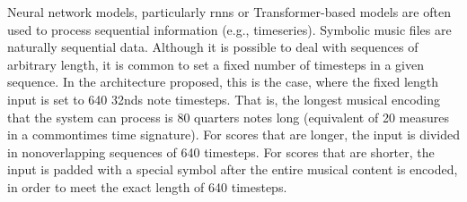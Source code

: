 
Neural network models, particularly \glspl{rnn} or
Transformer-based models are often used to process
sequential information (e.g., timeseries). Symbolic music
files are naturally sequential data. Although it is possible
to deal with sequences of arbitrary length, it is common to
set a fixed number of timesteps in a given sequence. In the
architecture proposed, this is the case, where the fixed
length input is set to 640 \glspl{32nd} note timesteps. That
is, the longest musical encoding that the system can process
is 80 \glspl{quarter} notes long (equivalent of 20 measures in
a \glspl{commontime} time signature). For scores that are
longer, the input is divided in nonoverlapping sequences of
640 timesteps. For scores that are shorter, the input is
padded with a special symbol after the entire musical
content is encoded, in order to meet the exact length of 640
timesteps.
